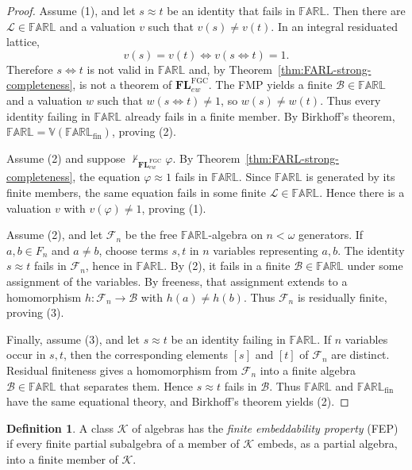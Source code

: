 \documentclass[final,12pt,times]{elsarticle}
\theoremstyle{plain}
\theoremstyle{definition}
\newtheorem{definition}{Definition}[section]
\theoremstyle{break}
\newcommand{\FARL}{\mathbb{FARL}}
\begin{document}
\begin{proof}
Assume (1), and let $s\approx t$ be an identity that fails in
$\FARL$.  Then there are $\mathscr{L}\in\FARL$ and a valuation
$v$ such that $v(s)\ne v(t)$.  In an integral residuated lattice,
\[
 v(s)=v(t)
 \Longleftrightarrow
 v(s\Leftrightarrow t)=1.
\]
Therefore $s\Leftrightarrow t$ is not valid in $\FARL$ and, by
Theorem~\ref{thm:FARL-strong-completeness}, is not a theorem of
$\mathbf{FL}^{\mathrm{FGC}}_{ew}$.  The FMP yields a finite
$\mathscr{B}\in\FARL$ and a valuation $w$ such that
$w(s\Leftrightarrow t)\ne1$, so $w(s)\ne w(t)$.  Thus every identity failing
in $\FARL$ already fails in a finite member.  By Birkhoff's theorem,
$\FARL=\mathbb V(\FARL_{\mathrm{fin}})$, proving (2).

Assume (2) and suppose
$\nvdash_{\mathbf{FL}^{\mathrm{FGC}}_{ew}}\varphi$.  By
Theorem~\ref{thm:FARL-strong-completeness}, the equation
$\varphi\approx1$ fails in $\FARL$.  Since $\FARL$ is
generated by its finite members, the same equation fails in some finite
$\mathscr{L}\in\FARL$.  Hence there is a valuation $v$ with
$v(\varphi)\ne1$, proving (1).

Assume (2), and let $\mathscr{F}_n$ be the free $\FARL$-algebra on
$n<\omega$ generators.  If $a,b\in F_n$ and $a\ne b$, choose terms $s,t$ in
$n$ variables representing $a,b$.  The identity $s\approx t$ fails in
$\mathscr{F}_n$, hence in $\FARL$.  By (2), it fails in a finite
$\mathscr{B}\in\FARL$ under some assignment of the variables.  By
freeness, that assignment extends to a homomorphism
$h:\mathscr{F}_n\to\mathscr{B}$ with $h(a)\ne h(b)$.  Thus $\mathscr{F}_n$ is
residually finite, proving (3).

Finally, assume (3), and let $s\approx t$ be an identity failing in
$\FARL$.  If $n$ variables occur in $s,t$, then the corresponding
elements $[s]$ and $[t]$ of $\mathscr{F}_n$ are distinct.  Residual finiteness
gives a homomorphism from $\mathscr{F}_n$ into a finite algebra
$\mathscr{B}\in\FARL$ that separates them.  Hence $s\approx t$ fails in
$\mathscr{B}$.  Thus $\FARL$ and
$\FARL_{\mathrm{fin}}$ have the same equational theory, and Birkhoff's
theorem yields (2).
\end{proof}

\begin{definition}\label{def:FEP-FARL}
A class $\mathcal K$ of algebras has the \emph{finite embeddability property}
(FEP) if every finite partial subalgebra of a member of $\mathcal K$ embeds, as
a partial algebra, into a finite member of $\mathcal K$.
\end{definition}
\end{document}
